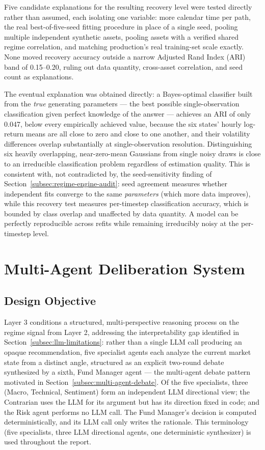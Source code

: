 Five candidate explanations for the resulting recovery level were tested directly rather than assumed, each isolating one variable: more calendar time per path, the real best-of-five-seed fitting procedure in place of a single seed, pooling multiple independent synthetic assets, pooling assets with a verified shared regime correlation, and matching production's real training-set scale exactly. None moved recovery accuracy outside a narrow Adjusted Rand Index (ARI) band of 0.15--0.20, ruling out data quantity, cross-asset correlation, and seed count as explanations.

The eventual explanation was obtained directly: a Bayes-optimal classifier built from the \emph{true} generating parameters --- the best possible single-observation classification given perfect knowledge of the answer --- achieves an ARI of only 0.047, below every empirically achieved value, because the six states' hourly log-return means are all close to zero and close to one another, and their volatility differences overlap substantially at single-observation resolution. Distinguishing six heavily overlapping, near-zero-mean Gaussians from single noisy draws is close to an irreducible classification problem regardless of estimation quality. This is consistent with, not contradicted by, the seed-sensitivity finding of Section~\ref{subsec:regime-engine-audit}: seed agreement measures whether independent fits converge to the same \emph{parameters} (which more data improves), while this recovery test measures per-timestep classification accuracy, which is bounded by class overlap and unaffected by data quantity. A model can be perfectly reproducible across refits while remaining irreducibly noisy at the per-timestep level.

\section{Multi-Agent Deliberation System}
\label{sec:multi-agent-methodology}

\subsection{Design Objective}
\label{subsec:agent-objective}

Layer 3 conditions a structured, multi-perspective reasoning process on the regime signal from Layer 2, addressing the interpretability gap identified in Section~\ref{subsec:llm-limitations}: rather than a single LLM call producing an opaque recommendation, five specialist agents each analyze the current market state from a distinct angle, structured as an explicit two-round debate synthesized by a sixth, Fund Manager agent --- the multi-agent debate pattern motivated in Section~\ref{subsec:multi-agent-debate}. Of the five specialists, three (Macro, Technical, Sentiment) form an independent LLM directional view; the Contrarian uses the LLM for its argument but has its direction fixed in code; and the Risk agent performs no LLM call. The Fund Manager's decision is computed deterministically, and its LLM call only writes the rationale. This terminology (five specialists, three LLM directional agents, one deterministic synthesizer) is used throughout the report.

